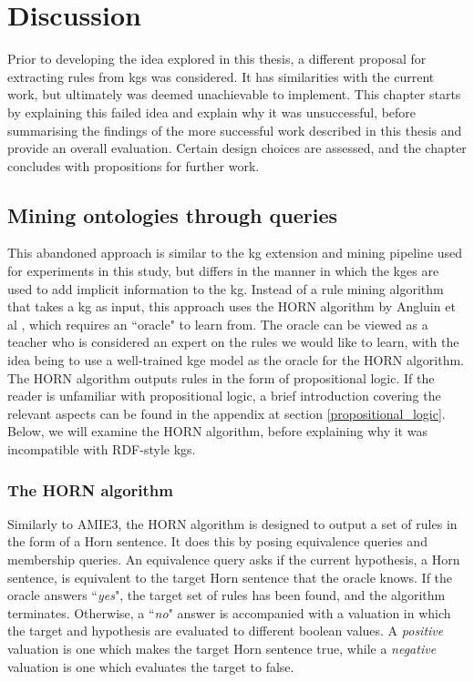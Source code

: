 \chapter{Discussion}
Prior to developing the idea explored in this thesis, a different proposal for extracting rules from \glspl{kg} was considered. It has similarities with the current work, but ultimately was deemed unachievable to implement. This chapter starts by explaining this failed idea and explain why it was unsuccessful, before summarising the findings of the more successful work described in this thesis and provide an overall evaluation. Certain design choices are assessed, and the chapter concludes with propositions for further work.

\section{Mining ontologies through queries}
This abandoned approach is similar to the \gls{kg} extension and mining pipeline used for experiments in this study, but differs in the manner in which the \glspl{kge} are used to add implicit information to the \gls{kg}. Instead of a rule mining algorithm that takes a \gls{kg} as input, this approach uses the HORN algorithm by Angluin et al \cite{DBLP:journals/ml/AngluinFP92}, which requires an ``oracle" to learn from. The oracle can be viewed as a teacher who is considered an expert on the rules we would like to learn, with the idea being to use a well-trained \gls{kge} model as the oracle for the HORN algorithm. The HORN algorithm outputs rules in the form of propositional logic. If the reader is unfamiliar with propositional logic, a brief introduction covering the relevant aspects can be found in the appendix at section \ref{propositional_logic}. Below, we will examine the HORN algorithm, before explaining why it was incompatible with RDF-style \glspl{kg}.

\subsection{The HORN algorithm}
Similarly to AMIE3, the HORN algorithm is designed to output a set of rules in the form of a Horn sentence. It does this by posing equivalence queries and membership queries. An equivalence query asks if the current hypothesis, a Horn sentence, is equivalent to the target Horn sentence that the oracle knows. If the oracle answers ``\textit{yes}", the target set of rules has been found, and the algorithm terminates. Otherwise, a ``\textit{no}" answer is accompanied with a valuation in which the target and hypothesis are evaluated to different boolean values. A \textit{positive} valuation is one which makes the target Horn sentence true, while a \textit{negative} valuation is one which evaluates the target to false. %

